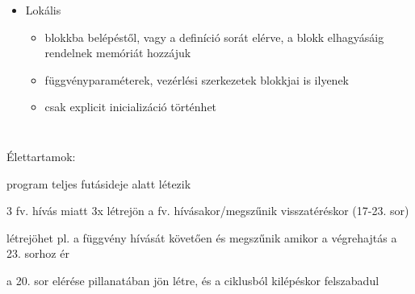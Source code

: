\documentclass[usenames,dvipsnames,aspectratio=169]{beamer}
\begin{document}
\begin{frame}
  \begin{columns}[T]
      \begin{itemize}
      \small
      \item Lokális
      \begin{itemize}
        \item blokkba belépéstől, vagy a definíció sorát elérve, a blokk elhagyásáig rendelnek memóriát hozzájuk
        \item függvényparaméterek, vezérlési szerkezetek blokkjai is ilyenek
        \item csak explicit inicializáció történhet
      \end{itemize}
    \end{itemize}
      \begin{exampleblock}{}
        \tiny
        
      \end{exampleblock}
  \end{columns}
  \vfill
  \scriptsize
  Élettartamok:
  \begin{description}[]
    \item[faktorialis] program teljes futásideje alatt létezik
    \item[$n$] 3 fv. hívás miatt 3x létrejön a fv. hívásakor/megszűnik visszatéréskor (17-23. sor)
    \item[$f$] létrejöhet pl. a függvény hívását követően és megszűnik amikor a végrehajtás a 23. sorhoz ér
    \item[$i$] a 20. sor elérése pillanatában jön létre, és a ciklusból kilépéskor felszabadul
  \end{description}
\end{frame}

\end{document}
